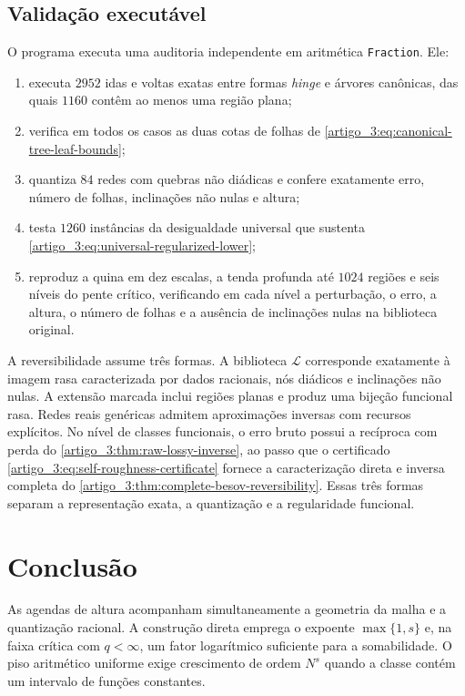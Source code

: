 \documentclass[12pt,a4paper]{article}
\theoremstyle{preciso}
\theoremstyle{definition}
\newcommand{\Library}{\mathcal{L}}
\theoremstyle{preciso}
\theoremstyle{preciso}
\theoremstyle{preciso}
\theoremstyle{preciso}
\theoremstyle{definition}
\theoremstyle{preciso}
\theoremstyle{definition}
\theoremstyle{preciso}
\theoremstyle{preciso}
\theoremstyle{definition}
\begin{document}
\subsection{Validação executável}

O programa  executa uma auditoria
independente em aritmética \texttt{Fraction}. Ele:
\begin{enumerate}[label=(\roman*),leftmargin=2.2em]
 \item executa $2952$ idas e voltas exatas entre formas \emph{hinge} e árvores
 canônicas, das quais $1160$ contêm ao menos uma região plana;
 \item verifica em todos os casos as duas cotas de folhas de
 \eqref{artigo_3:eq:canonical-tree-leaf-bounds};
 \item quantiza $84$ redes com quebras não diádicas e confere exatamente erro,
 número de folhas, inclinações não nulas e altura;
 \item testa $1260$ instâncias da desigualdade universal que sustenta
 \eqref{artigo_3:eq:universal-regularized-lower};
 \item reproduz a quina em dez escalas, a tenda profunda até $1024$ regiões e
 seis níveis do pente crítico, verificando em cada nível a perturbação, o erro,
 a altura, o número de folhas e a ausência de inclinações nulas na biblioteca
 original.
\end{enumerate}

A reversibilidade assume três formas. A biblioteca $\Library$ corresponde
exatamente à imagem rasa caracterizada por dados racionais, nós diádicos e
inclinações não nulas. A extensão marcada inclui regiões planas e produz uma
bijeção funcional rasa. Redes reais genéricas admitem aproximações inversas
com recursos explícitos. No nível de classes funcionais, o erro bruto possui a recíproca com perda do
\cref{artigo_3:thm:raw-lossy-inverse}, ao passo que o certificado
\eqref{artigo_3:eq:self-roughness-certificate} fornece a caracterização direta e
inversa completa do \cref{artigo_3:thm:complete-besov-reversibility}. Essas três formas
separam a representação exata, a quantização e a regularidade funcional.
\section{Conclusão}
As agendas de altura acompanham simultaneamente a geometria da malha e a quantização racional. A construção direta emprega o expoente $\max\{1,s\}$ e, na faixa crítica com $q<\infty$, um fator logarítmico suficiente para a somabilidade. O piso aritmético uniforme exige crescimento de ordem $N^s$ quando a classe contém um intervalo de funções constantes.
\end{document}
